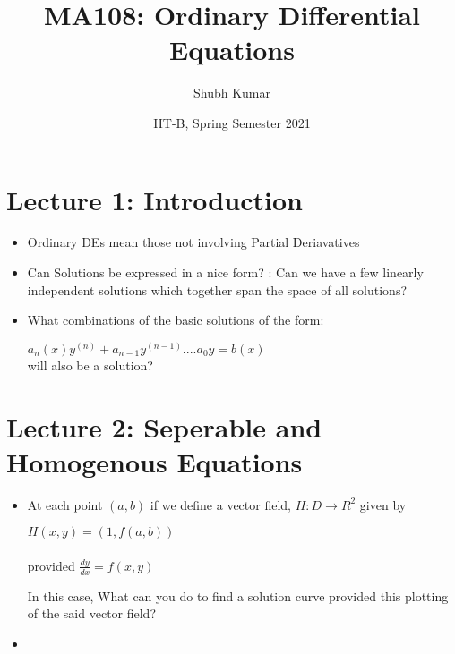 \documentclass{article}
\title{MA108: Ordinary Differential Equations}
\author{Shubh Kumar}
\date{IIT-B, Spring Semester 2021}
\begin{document}
\maketitle

\section{Lecture 1: Introduction}

  \begin{itemize}
    \item Ordinary DEs mean those not involving Partial Deriavatives
    \item Can Solutions be expressed in a nice form? : Can we have a few linearly independent solutions which together span the space of all solutions?
    \item What combinations of the basic solutions of the form: \\
    \begin{center}
      $a_{n}(x)y^{(n)}+a_{n-1}y^{(n-1)}....a_{0}y = b(x)$ \\
      will also be a solution?
    \end{center}
  \end{itemize}

 \section {Lecture 2: Seperable and Homogenous Equations}

 \begin{itemize}
   \item At each point $(a,b)$ if we define a vector field, $H: D \rightarrow R^{2}$ given by \\
   \begin{center}
     $H(x,y) = (1,f(a,b))$ \\~\\
     provided $\frac{dy}{dx} = f(x,y)$ \\
   \end{center}
   In this case, What can you do to find a solution curve provided this plotting of the said vector field?

   \item
 \end{itemize}
\end{document}
